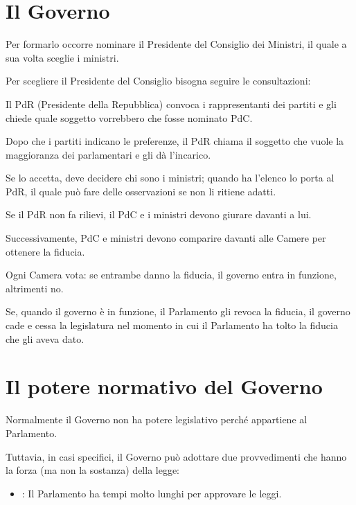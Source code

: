 \documentclass[letterpaper,10pt,italian]{sphinxmanual}
\begin{document}
\sphinxstepscope


\chapter{Il Governo}
\label{\detokenize{IL GOVERNO:il-governo}}\label{\detokenize{IL GOVERNO::doc}}
\sphinxAtStartPar
Per formarlo occorre nominare il Presidente del Consiglio dei Ministri, il quale a sua volta sceglie i ministri.

\sphinxAtStartPar
Per scegliere il Presidente del Consiglio bisogna seguire le consultazioni:

\sphinxAtStartPar
Il PdR (Presidente della Repubblica) convoca i rappresentanti dei partiti e gli chiede quale soggetto vorrebbero che
fosse nominato PdC.

\sphinxAtStartPar
Dopo che i partiti indicano le preferenze, il PdR chiama il soggetto che vuole la maggioranza dei parlamentari e
gli dà l’incarico.

\sphinxAtStartPar
Se lo accetta, deve decidere chi sono i ministri; quando ha l’elenco lo porta al PdR, il quale può fare
delle osservazioni se non li ritiene adatti.

\sphinxAtStartPar
Se il PdR non fa rilievi, il PdC e i ministri devono giurare davanti a lui.

\sphinxAtStartPar
Successivamente, PdC e ministri devono comparire davanti alle Camere per ottenere la fiducia.

\sphinxAtStartPar
Ogni Camera vota: se entrambe danno la fiducia, il governo entra in funzione, altrimenti no.

\sphinxAtStartPar
Se, quando il governo è in funzione, il Parlamento gli revoca la fiducia, il governo cade e cessa la
legislatura nel momento in cui il Parlamento ha tolto la fiducia che gli aveva dato.

\sphinxstepscope


\chapter{Il potere normativo del Governo}
\label{\detokenize{IL POTERE NORMATIVO DEL GOVERNO:il-potere-normativo-del-governo}}\label{\detokenize{IL POTERE NORMATIVO DEL GOVERNO::doc}}
\sphinxAtStartPar
Normalmente il Governo non ha potere legislativo perché appartiene al Parlamento.

\sphinxAtStartPar
Tuttavia, in casi specifici, il Governo può adottare due provvedimenti che hanno la forza (ma non la sostanza) della legge:
\begin{itemize}
\item {} 
\sphinxAtStartPar
{}: Il Parlamento ha tempi molto lunghi per approvare le leggi.

\end{itemize}
\end{document}
